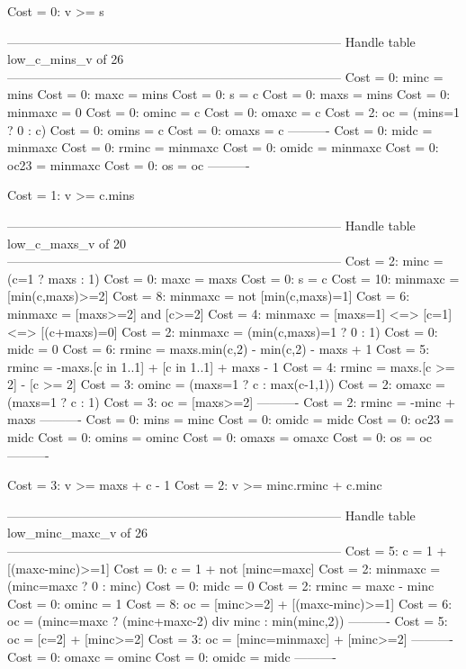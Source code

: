 Cost =  0:  v >= s

--------------------------------------------------------------------------------
Handle table low_c_mins_v of 26
--------------------------------------------------------------------------------
Cost =  0:  minc    = mins
Cost =  0:  maxc    = mins
Cost =  0:  s       = c
Cost =  0:  maxs    = mins
Cost =  0:  minmaxc = 0
Cost =  0:  ominc   = c
Cost =  0:  omaxc   = c
Cost =  2:  oc      = (mins=1 ? 0 : c)
Cost =  0:  omins   = c
Cost =  0:  omaxs   = c
----------
Cost =  0:  midc    = minmaxc
Cost =  0:  rminc   = minmaxc
Cost =  0:  omidc   = minmaxc
Cost =  0:  oc23    = minmaxc
Cost =  0:  os      = oc
----------

Cost =  1:  v >= c.mins

--------------------------------------------------------------------------------
Handle table low_c_maxs_v of 20
--------------------------------------------------------------------------------
Cost =  2:  minc    = (c=1 ? maxs : 1)
Cost =  0:  maxc    = maxs
Cost =  0:  s       = c
Cost = 10:  minmaxc = [min(c,maxs)>=2]
Cost =  8:  minmaxc = not [min(c,maxs)=1]
Cost =  6:  minmaxc = [maxs>=2] and [c>=2]
Cost =  4:  minmaxc = [maxs=1] <=> [c=1] <=> [(c+maxs)=0]
Cost =  2:  minmaxc = (min(c,maxs)=1 ? 0 : 1)
Cost =  0:  midc    = 0
Cost =  6:  rminc   = maxs.min(c,2) - min(c,2) - maxs + 1
Cost =  5:  rminc   = -maxs.[c in 1..1] + [c in 1..1] + maxs - 1
Cost =  4:  rminc   = maxs.[c >= 2] - [c >= 2]
Cost =  3:  ominc   = (maxs=1 ? c : max(c-1,1))
Cost =  2:  omaxc   = (maxs=1 ? c : 1)
Cost =  3:  oc      = [maxs>=2]
----------
Cost =  2:  rminc   = -minc + maxs
----------
Cost =  0:  mins    = minc
Cost =  0:  omidc   = midc
Cost =  0:  oc23    = midc
Cost =  0:  omins   = ominc
Cost =  0:  omaxs   = omaxc
Cost =  0:  os      = oc
----------

Cost =  3:  v >= maxs + c - 1
Cost =  2:  v >= minc.rminc + c.minc

--------------------------------------------------------------------------------
Handle table low_minc_maxc_v of 26
--------------------------------------------------------------------------------
Cost =  5:  c       = 1 + [(maxc-minc)>=1]
Cost =  0:  c       = 1 + not [minc=maxc]
Cost =  2:  minmaxc = (minc=maxc ? 0 : minc)
Cost =  0:  midc    = 0
Cost =  2:  rminc   = maxc - minc
Cost =  0:  ominc   = 1
Cost =  8:  oc      = [minc>=2] + [(maxc-minc)>=1]
Cost =  6:  oc      = (minc=maxc ? (minc+maxc-2) div minc : min(minc,2))
----------
Cost =  5:  oc      = [c=2] + [minc>=2]
Cost =  3:  oc      = [minc=minmaxc] + [minc>=2]
----------
Cost =  0:  omaxc   = ominc
Cost =  0:  omidc   = midc
----------

